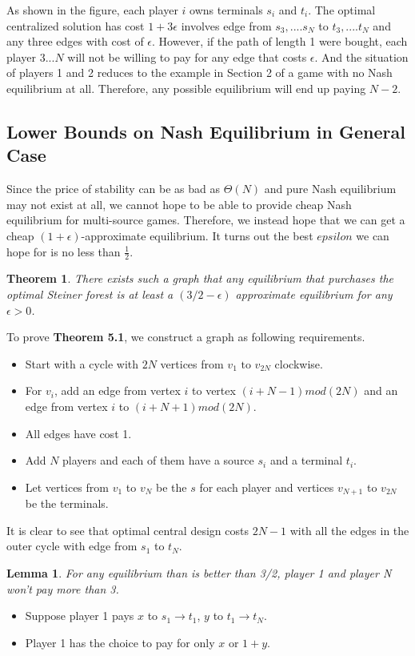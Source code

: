 \documentclass[11pt,psfig,times]{article}
\newtheorem{theorem}{Theorem}[section]
\newtheorem{lemma}{Lemma}[section]
\begin{document}
	As shown in the figure, each player $i$ owns terminals $s_i$ and $t_i$. The optimal
	centralized solution has cost $1 + 3\epsilon$ involves edge from $s_3,....s_N$ to $t_3,....t_N$ and any three edges with cost of $\epsilon$. However, if the path of length 1 were bought, each player $3...N$ will not be willing	to pay for any edge that costs $\epsilon$. And the situation of players 1 and 2 reduces to the example in Section 2
	of a game with no Nash equilibrium at all. Therefore, any possible equilibrium will end up paying $N-2$.
	
	\subsection{Lower Bounds on Nash Equilibrium in General Case}
	Since the price of stability can be as bad as $\Theta(N)$ and pure Nash equilibrium may not exist at all, we cannot hope to be able to provide cheap Nash equilibrium for multi-source games. Therefore, we instead hope that we can get a cheap $(1+\epsilon)$-approximate equilibrium. It turns out the best $epsilon$ we can hope for is no less than $\frac{1}{2}$.

	\begin{theorem}
		There exists such a graph that any equilibrium that purchases the optimal Steiner forest is at least a $(3/2-\epsilon)$ approximate equilibrium for any $\epsilon > 0$.
	\end{theorem}
	
	To prove \textbf{Theorem 5.1}, we construct a graph as following requirements. 
	
	\begin{itemize}
		\item Start with a cycle with $2N$ vertices from $v_1 \text{ to } v_{2N}$ clockwise. 
		\item For $v_i$, add an edge from vertex $i$ to vertex $(i+N-1)mod (2N)$ and an edge from vertex $i$ to $(i+N+1)mod (2N)$.
		\item All edges have cost 1. 
		\item Add $N$ players and each of them have a source $s_i$ and a terminal $t_i$. 
		\item Let vertices from $v_1$ to $v_N$ be the $s$ for each player and vertices $v_{N+1}$ to $v_{2N}$ be the terminals.
	\end{itemize}
	It is clear to see that optimal central design costs $2N-1$ with all the edges in the outer cycle with edge from $s_1$ to $t_N$. 
		   
		\begin{lemma}
			For any equilibrium than is better than 3/2, player 1 and player N won't pay more than 3. 
		\end{lemma}
		\begin{itemize}
			\item Suppose player 1 pays $x$ to $s_1 \rightarrow t_1$, $y$ to $t_1 \rightarrow t_N$. 
			\item Player 1 has the choice to pay for only $x$ or $1+y$. 
		\end{itemize}
		
\end{document}
